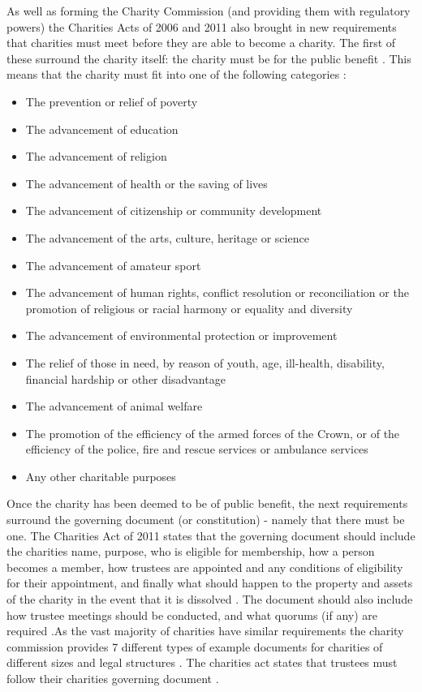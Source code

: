 \documentclass{UoYCSproject}
\begin{document}
As well as forming the Charity Commission (and providing them with regulatory powers) the Charities Acts of 2006 and 2011 also brought in new requirements that charities must meet before they are able to become a charity. The first of these surround the charity itself: the charity must be for the public benefit \cite{charities_act_2011_section_4_public_benefit}. This means that the charity must fit into one of the following categories \cite{charities_act_2011_section_3_purpose}:
\begin{itemize}[noitemsep]
    \item The prevention or relief of poverty
    \item The advancement of education
    \item The advancement of religion
    \item The advancement of health or the saving of lives
    \item The advancement of citizenship or community development
    \item The advancement of the arts, culture, heritage or science
    \item The advancement of amateur sport
    \item The advancement of human rights, conflict resolution or reconciliation or the promotion of religious or racial harmony or equality and diversity
    \item The advancement of environmental protection or improvement
    \item The relief of those in need, by reason of youth, age, ill-health, disability, financial hardship or other disadvantage
    \item The advancement of animal welfare
    \item The promotion of the efficiency of the armed forces of the Crown, or of the efficiency of the police, fire and rescue services or ambulance services
    \item Any other charitable purposes
\end{itemize}

Once the charity has been deemed to be of public benefit, the next requirements surround the governing document (or constitution) - namely that there must be one. The Charities Act of 2011 states that the governing document should include the charities name, purpose, who is eligible for membership, how a person becomes a member, how trustees are appointed and any conditions of eligibility for their appointment, and finally what should happen to the property and assets of the charity in the event that it is dissolved \cite{charities_act_2011_section_206_governing_doc}. The document should also include how trustee meetings should be conducted, and what quorums (if any) are required \cite{charities_act_2011_section_223_trustee_responsibilities}.As the vast majority of charities have similar requirements the charity commission provides 7 different types of example documents for charities of different sizes and legal structures \cite{gov_uk_example_trustee_docs}. The charities act states that trustees must follow their charities governing document \cite{charities_act_2011_section_223_trustee_responsibilities}. 
\end{document}
